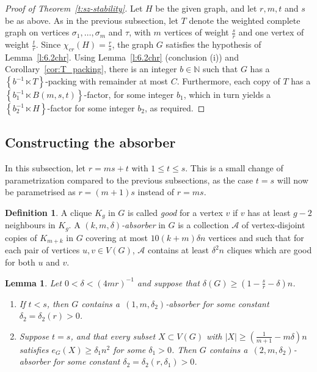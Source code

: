 \documentclass[reqno, 12pt]{amsart}
\numberwithin{equation}{section}
\numberwithin{figure}{section}
\theoremstyle{plain}
\newtheorem{lemma}[thm]{Lemma}
\theoremstyle{definition}
\newtheorem{definition}[thm]{Definition}
\def\NN{\mathds N}
\def\cA{{\mathcal A}}
\def \absorber{\cA}
\begin{document}
        \begin{proof}
            [Proof of Theorem~\ref{t:sz-stability}]
            Let $H$ be the given graph, and let $r, m, t$ and $s$ be as above. As in the previous subsection, let $T$ denote the weighted complete graph on vertices $\sigma_1,\dots,\sigma_m$ and $\tau$, with $m$ vertices of weight $\frac{s}{r}$ and one vertex of weight $\frac{t}{r}$. Since $\chi_{cr}(H) = \frac{r}{s}$, the graph $G$ satisfies the hypothesis of Lemma~\ref{l:6.2chr}. Using Lemma~\ref{l:6.2chr} (conclusion (i)) and Corollary~\ref{cor:T_packing}, there is an integer $b \in \NN$ such that $G$ has a $\left\{ b^{-1} \ltimes T\right\}$-packing with remainder at most $C$. Furthermore, each copy of $T$ has a $\left\{b_1^{-1} \ltimes B(m,s,t)\right\}$-factor, for some integer $b_1$, which in turn yields a $\left\{b_2^{-1} \ltimes H\right\}$-factor for some integer $b_2$, as required.
        \end{proof}
        

          
    
    \subsection{Constructing the absorber}
        
    In this subsection, let $r=ms+t$ with $1\leq t \leq s$. This is a small change of parametrization compared to the previous subsections, as the case $t=s$ will now be parametrised as $r=(m+1)s$ instead of $r=ms$. 

    \begin{definition} 
        \label{def:absorber}
        A clique $K_g$ in $G$ is called \textit{good} for a vertex $v$ if $v$ has at least $g-2$ neighbours in $K_g$. A \textit{$(k, m, \delta)$-absorber} in $G$ is a collection $\absorber$ of vertex-disjoint copies of  $K_{m+k}$ in $G$ covering at most $10(k+m)\delta n$ vertices and such that for each pair of vertices $u,v\in V(G)$, $\absorber$ contains at least $\delta^2 n$ cliques which are good for both $u$ and $v$. 
    \end{definition}
    
    \begin{lemma}\label{l:absorber}
        Let $0<\delta<(4mr)^{-1}$ and suppose that $\delta(G)\geq \left(1-\frac sr -\delta\right)n$.
        \begin{enumerate}[label=(\roman*)]
            \item\label{l:absorber(i)} If $t < s$, then $G$ contains a~$(1, m, \delta_2)$-absorber for some constant $\delta_2=\delta_2(r)>0$. 
            
            \item\label{l:absorber(ii)} Suppose $t = s$, and that every subset $X\subset V(G)$ with $|X|\geq\left(\frac1{m+1}-m\delta\right)n$ satisfies $e_G(X)\geq\delta_1 n^2$ for some $\delta_1>0$. Then $G$ contains a~$(2, m, \delta_2)$-absorber for some constant $\delta_2=\delta_2(r,\delta_1)>0$.
            
        \end{enumerate}
    \end{lemma}
        
\end{document}
